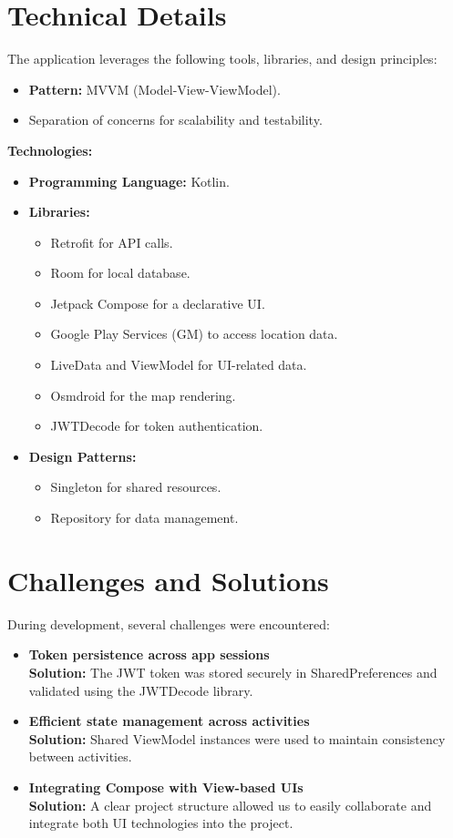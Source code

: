 \documentclass{article}
\begin{document}
\section*{Technical Details}
The application leverages the following tools, libraries, and design principles:
\begin{itemize}
    \item \textbf{Pattern:} MVVM (Model-View-ViewModel).
    \item Separation of concerns for scalability and testability.
\end{itemize}
\textbf{Technologies:}
\begin{itemize}
    \item \textbf{Programming Language:} Kotlin.
    \item \textbf{Libraries:}
          \begin{itemize}
              \item Retrofit for API calls.
              \item Room for local database.
              \item Jetpack Compose for a declarative UI.
              \item Google Play Services (GM) to access location data.
              \item LiveData and ViewModel for UI-related data.
              \item Osmdroid for the map rendering.
              \item JWTDecode for token authentication.
          \end{itemize}
    \item \textbf{Design Patterns:}
          \begin{itemize}
              \item Singleton for shared resources.
              \item Repository for data management.
          \end{itemize}
\end{itemize}


\section*{Challenges and Solutions}
During development, several challenges were encountered:
\begin{itemize}
    \item \textbf{Token persistence across app sessions}\\
          \textbf{Solution:} The JWT token was stored securely in SharedPreferences and validated using the JWTDecode library.
    \item \textbf{Efficient state management across activities}\\
          \textbf{Solution:} Shared ViewModel instances were used to maintain consistency between activities.
    \item \textbf{Integrating Compose with View-based UIs}\\
          \textbf{Solution:} A clear project structure allowed us to easily collaborate and integrate both UI technologies into the project.
\end{itemize}
\end{document}
